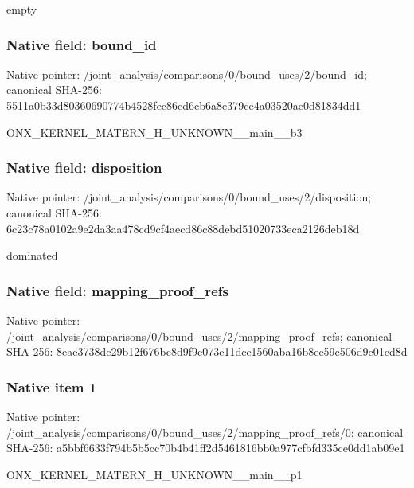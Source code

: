 \documentclass[10pt,a4paper]{article}
\begin{document}
\begingroup\raggedright\sloppy empty\par\endgroup

\subsubsection{Native field: bound\_\allowbreak{}id}
Native pointer: /joint\_\allowbreak{}analysis/comparisons/0/bound\_\allowbreak{}uses/2/bound\_\allowbreak{}id; canonical SHA-256: 5511a0b33d80360690774b4528fec86cd6cb6a8e379ce4a03520ae0d81834dd1

\begingroup\raggedright\sloppy ONX\_\allowbreak{}KERNEL\_\allowbreak{}MATERN\_\allowbreak{}H\_\allowbreak{}UNKNOWN\_\allowbreak{}\_\allowbreak{}main\_\allowbreak{}\_\allowbreak{}b3\par\endgroup

\subsubsection{Native field: disposition}
Native pointer: /joint\_\allowbreak{}analysis/comparisons/0/bound\_\allowbreak{}uses/2/disposition; canonical SHA-256: 6c23c78a0102a9e2da3aa478cd9cf4aecd86c88debd51020733eca2126deb18d

\begingroup\raggedright\sloppy dominated\par\endgroup

\subsubsection{Native field: mapping\_\allowbreak{}proof\_\allowbreak{}refs}
Native pointer: /joint\_\allowbreak{}analysis/comparisons/0/bound\_\allowbreak{}uses/2/mapping\_\allowbreak{}proof\_\allowbreak{}refs; canonical SHA-256: 8eae3738dc29b12f676bc8d9f9c073e11dce1560aba16b8ee59c506d9c01cd8d

\subsubsection{Native item 1}
Native pointer: /joint\_\allowbreak{}analysis/comparisons/0/bound\_\allowbreak{}uses/2/mapping\_\allowbreak{}proof\_\allowbreak{}refs/0; canonical SHA-256: a5bbf6633f794b5b5cc70b4b41ff2d5461816bb0a977cfbfd335ce0dd1ab09e1

\begingroup\raggedright\sloppy ONX\_\allowbreak{}KERNEL\_\allowbreak{}MATERN\_\allowbreak{}H\_\allowbreak{}UNKNOWN\_\allowbreak{}\_\allowbreak{}main\_\allowbreak{}\_\allowbreak{}p1\par\endgroup
\end{document}

